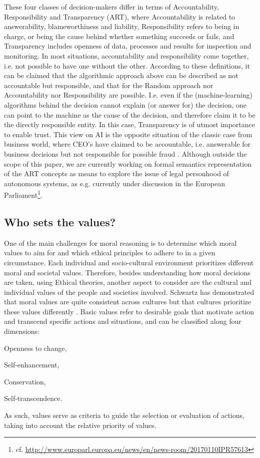 \documentclass[twocolumn]{article}
\begin{document}
These four classes of decision-makers differ in terms of Accountability, Responsibility and Transparency (ART), where Accountability is related to answerability, blameworthiness and liability, Responsibility refers to being in charge, or being the cause behind whether something succeeds or fails, and Transparency includes openness of data, processes and results for inspection and monitoring. In most situations, accountability and responsibility come together, i.e. not possible to have one without the other. According to these definitions, it can be claimed that the algorithmic approach above can be described as not accountable but responsible, and that for the Random approach nor Accountability nor Responsibility are possible. I.e. even if the (machine-learning) algorithms behind the decision cannot explain (or answer for) the decision, one can point to the machine as the cause of the decision, and therefore claim it to be the directly responsible entity. In this case, Transparency is of utmost importance to enable trust. This view on AI is the opposite situation of the classic case from business world, where CEO's have claimed to be accountable, i.e. answerable for business decisions but not responsible for possible fraud \cite{Lay11}. Although outside the scope of this paper, we are currently working on  formal semantics representation of the ART concepts as means to explore the issue of legal personhood of autonomous systems, as e.g. currently under discussion in the European Parliament\footnote{cf. \url{http://www.europarl.europa.eu/news/en/news-room/20170110IPR57613}}.








\subsection{Who sets the values?}\label{sec:which}
One of the main challenges for moral reasoning is to determine which moral values to aim for and which ethical principles to adhere to in a given circumstance. Each individual and socio-cultural environment prioritizes different moral and societal values. Therefore, besides understanding how moral decisions are taken, using Ethical theories, another aspect to consider are the cultural and individual values of the people and societies involved. Schwartz has demonstrated that moral values are quite consistent across cultures \cite{Schwartz2006} but that cultures prioritize these values differently \cite{schwartz2006culture,hofstede2001culture}. Basic values refer to desirable goals that motivate action and transcend specific actions and situations, and can be classified along four dimensions:
\begin{inparaenum}[(i)]
\item Openness to change, 
\item Self-enhancement, 
\item Conservation,
\item Self-transcendence.
\end{inparaenum}
As such, values serve as criteria to guide the selection or evaluation of actions, taking into account the relative priority of values. 
\end{document}
